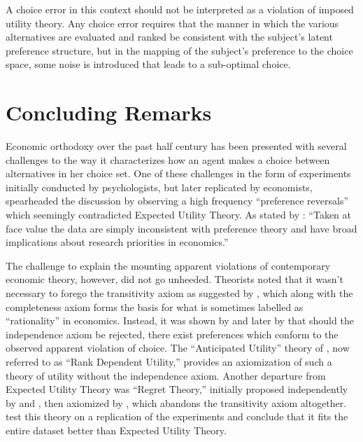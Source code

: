 \documentclass[../main.tex]{subfiles}
\begin{document}
A choice error in this context should not be interpreted as a violation of imposed utility theory.
Any choice error requires that the manner in which the various alternatives are evaluated and ranked be consistent with the subject's latent preference structure, but in the mapping of the subject's preference to the choice space, some noise is introduced that leads to a sub-optimal choice.

\singlespacing
\section{Concluding Remarks}
\doublespacing

Economic orthodoxy over the past half century has been presented with several challenges to the way it characterizes how an agent makes a choice between alternatives in her choice set.
One of these challenges in the form of experiments initially conducted by psychologists, but later replicated by economists, spearheaded the discussion by observing a high frequency \enquote{preference reversals} which seemingly contradicted Expected Utility Theory.
As stated by \textcite{Grether1979}: \enquote{Taken at face value the data are simply inconsistent with preference theory and have broad implications about research priorities in economics.}

The challenge to explain the mounting apparent violations of contemporary economic theory, however, did not go unheeded.
Theorists noted that it wasn't necessary to forego the transitivity axiom as suggested by \textcite[623]{Grether1979}, which along with the completeness axiom forms the basis for what is sometimes labelled as \enquote{rationality} in economics.
Instead, it was shown by \textcite{Holt1986} and later by \textcite{Karni1987} that should the independence axiom be rejected, there exist preferences which conform to the observed apparent violation of choice.
The \enquote{Anticipated Utility} theory of \textcite{Quiggin1982}, now referred to as \enquote{Rank Dependent Utility,} provides an axiomization of such a theory of utility without the independence axiom.
Another departure from Expected Utility Theory was \enquote{Regret Theory,} initially proposed independently by \textcite{Bell1982} and \textcite{Loomes1982}, then axiomized by \textcite{Fishburn1987}, which abandons the transitivity axiom altogether.
\textcite{Loomes1989} test this theory on a replication of the \textcite{Grether1979} experiments and conclude that it fits the entire dataset better than Expected Utility Theory.
\end{document}
